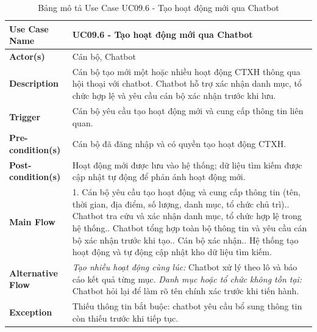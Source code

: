 \begin{table}[H]
	\centering
	\renewcommand{\arraystretch}{1.25}
	\begin{tabular}{|p{3.8cm}|p{11.2cm}|}
		\hline
		\textbf{Use Case Name} & \textbf{UC09.6 - Tạo hoạt động mới qua Chatbot} \\ \hline
		\textbf{Actor(s)} & Cán bộ, Chatbot \\ \hline
		\textbf{Description} & Cán bộ tạo mới một hoặc nhiều hoạt động CTXH thông qua hội thoại với chatbot. Chatbot hỗ trợ xác nhận danh mục, tổ chức hợp lệ và yêu cầu cán bộ xác nhận trước khi lưu. \\ \hline
		\textbf{Trigger} & Cán bộ yêu cầu tạo hoạt động mới và cung cấp thông tin liên quan. \\ \hline
		\textbf{Pre-condition(s)} & Cán bộ đã đăng nhập và có quyền tạo hoạt động CTXH. \\ \hline
		\textbf{Post-condition(s)} & Hoạt động mới được lưu vào hệ thống; dữ liệu tìm kiếm được cập nhật tự động để phản ánh hoạt động mới. \\ \hline
		\textbf{Main Flow} &
		1. Cán bộ yêu cầu tạo hoạt động và cung cấp thông tin (tên, thời gian, địa điểm, số lượng, danh mục, tổ chức chủ trì).\newline
		2. Chatbot tra cứu và xác nhận danh mục, tổ chức hợp lệ trong hệ thống.\newline
		3. Chatbot tổng hợp toàn bộ thông tin và yêu cầu cán bộ xác nhận trước khi tạo.\newline
		4. Cán bộ xác nhận.\newline
		5. Hệ thống tạo hoạt động và tự động cập nhật kho dữ liệu tìm kiếm. \\ \hline
		\textbf{Alternative Flow} &
		\textit{Tạo nhiều hoạt động cùng lúc:} Chatbot xử lý theo lô và báo cáo kết quả từng mục.\newline
		\textit{Danh mục hoặc tổ chức không tồn tại:} Chatbot hỏi lại để làm rõ tên chính xác trước khi tiến hành. \\ \hline
		\textbf{Exception} & Thiếu thông tin bắt buộc: chatbot yêu cầu bổ sung thông tin còn thiếu trước khi tiếp tục. \\ \hline
	\end{tabular}
	\caption{Bảng mô tả Use Case UC09.6 - Tạo hoạt động mới qua Chatbot}
\end{table}

